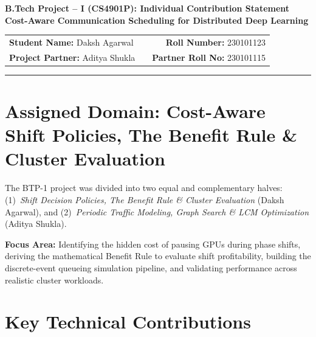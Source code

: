 \documentclass[11pt,a4paper]{article}
\begin{document}
\begin{center}
    {\Large\bfseries\color{primaryblue} B.Tech Project -- I (CS4901P): Individual Contribution Statement}\\[3pt]
    {\large\textbf{Cost-Aware Communication Scheduling for Distributed Deep Learning}}
\end{center}

\vspace{-4pt}
\begin{center}
\begin{tabularx}{\textwidth}{@{}lXr@{}}
    \textbf{Student Name:} Daksh Agarwal & & \textbf{Roll Number:} 230101123 \\
    \textbf{Project Partner:} Aditya Shukla & & \textbf{Partner Roll No:} 230101115
\end{tabularx}
\end{center}
\vspace{-6pt}
\hrule
\vspace{4pt}

\section*{Assigned Domain: Cost-Aware Shift Policies, The Benefit Rule \& Cluster Evaluation}
The BTP-1 project was divided into two equal and complementary halves: (1)~\emph{Shift Decision Policies, The Benefit Rule \& Cluster Evaluation} (Daksh Agarwal), and (2)~\emph{Periodic Traffic Modeling, Graph Search \& LCM Optimization} (Aditya Shukla).

\vspace{2pt}
\noindent
\textbf{Focus Area:} Identifying the hidden cost of pausing GPUs during phase shifts, deriving the mathematical Benefit Rule to evaluate shift profitability, building the discrete-event queueing simulation pipeline, and validating performance across realistic cluster workloads.

\section*{Key Technical Contributions}
\end{document}
